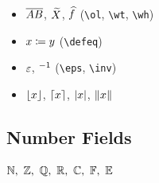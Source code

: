 \documentclass[11pt,oneside]{scrbook}
\begin{document}
\begin{itemize}
    \item $\overline{AB}$, $\widetilde{X}$, $\widehat{f}$ \quad(\texttt{\textbackslash ol}, \texttt{\textbackslash wt}, \texttt{\textbackslash wh})
    \item $x \coloneqq y$                   \quad(\texttt{\textbackslash defeq})
    \item $\varepsilon$, $^{-1}$                 \quad(\texttt{\textbackslash eps}, \texttt{\textbackslash inv})
    \item $\left\lfloor x \right\rfloor$, $\left\lceil x \right\rceil$, $\left\lvert x \right\rvert$, $\left\lVert x \right\rVert$
\end{itemize}

\subsection{Number Fields}

$\NN,\ \ZZ,\ \QQ,\ \RR,\ \CC,\ \FF,\ \EE$
\end{document}
